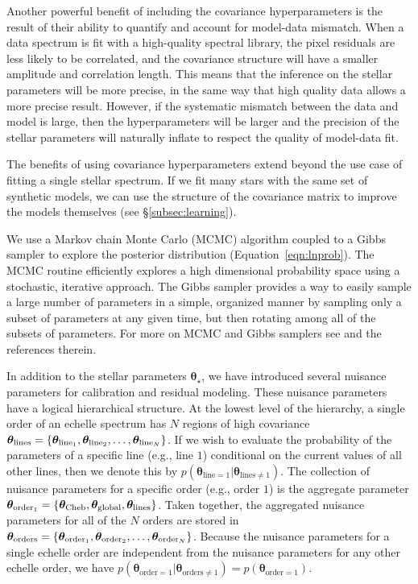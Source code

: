 \documentclass[iop,floatfix]{emulateapj}
\newcommand{\vt}{ {\bm \theta}}
\newcommand{\vtstar}{\vt_{\star}}
\newcommand{\vtcheb}{\vt_{\rm Cheb}}
\newcommand{\vtglobal}{\vt_{\rm global}}
\newcommand{\vtorder}[1]{\vt_{{\rm order}_{#1}}}
\newcommand{\vtorders}{\vt_{\rm orders}}
\newcommand{\vtline}[1]{\vt_{{\rm line}_{#1}}}
\newcommand{\vtlines}{\vt_{\rm lines}}
\begin{document}
Another powerful benefit of including the covariance hyperparameters is the result of their ability to quantify and account for model-data mismatch. When a data spectrum is fit with a high-quality spectral library, the pixel residuals are less likely to be correlated, and the covariance structure will have a smaller amplitude and correlation length. This means that the inference on the stellar parameters will be more precise, in the same way that high quality data allows a more precise result. However, if the systematic mismatch between the data and model is large, then the hyperparameters will be larger and the precision of the stellar parameters will naturally inflate to respect the quality of model-data fit.

The benefits of using covariance hyperparameters extend beyond the use case of fitting a single stellar spectrum. If we fit many stars with the same set of synthetic models, we can use the structure of the covariance matrix to improve the models themselves (see \S\ref{subsec:learning}).


We use a Markov chain Monte Carlo (MCMC) algorithm coupled to a Gibbs sampler to explore the posterior distribution (Equation~\ref{eqn:lnprob}). The MCMC routine efficiently explores a high dimensional probability space using a stochastic, iterative approach. The Gibbs sampler provides a way to easily sample a large number of parameters in a simple, organized manner by sampling only a subset of parameters at any given time, but then rotating among all of the subsets of parameters. For more on MCMC and Gibbs samplers see \citet[ch 11]{gelman13} and the references therein. 

In addition to the stellar parameters $\vtstar$, we have introduced several nuisance parameters for calibration and residual modeling. These nuisance parameters have a logical hierarchical structure. At the lowest level of the hierarchy, a single order of an echelle spectrum has $N$ regions of high covariance $\vtlines = \{\vtline{1}, \vtline{2}, \ldots, \vtline{N}\}$. If we wish to evaluate the probability of the parameters of a specific line (e.g., line $1$) conditional on the current values of all other lines, then we denote this by $p(\vt_{\textrm{line} = 1} | \vt_{\textrm{lines} \ne 1})$. The collection of nuisance parameters for a specific order  (e.g., order $1$) is the aggregate parameter $\vtorder{1} = \{\vtcheb, \vtglobal, \vtlines\}$. Taken together, the aggregated nuisance parameters for all of the $N$ orders are stored in $\vtorders = \{\vtorder{1}, \vtorder{2}, \ldots, \vtorder{N} \}$. Because the nuisance parameters for a single echelle order are independent from the nuisance parameters for any other echelle order, we have $p(\vt_{\textrm{order} = 1} | \vt_{\textrm{orders} \ne 1}) = p(\vt_{\textrm{order} = 1})$. 
\end{document}
